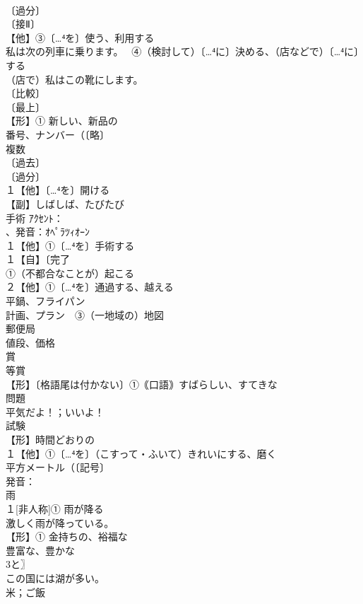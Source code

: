 \documentclass[8pt]{extreport}
\begin{document}
\begin{CJK}{UTF8}{min}
\\	〔過分〕
\\	〔接Ⅱ〕
\\	【他】③〔…⁴を〕使う、利用する 
\\	私は次の列車に乗ります。　 ④（検討して）〔…⁴に〕決める、（店などで）〔…⁴に〕する 
\\	（店で）私はこの靴にします。
\\	〔比較〕
\\	〔最上〕
\\	【形】① 新しい、新品の
\\	番号、ナンバー（〔略〕
\\	複数
\\	〔過去〕
\\	〔過分〕
\\	１【他】〔…⁴を〕開ける
\\	【副】しばしば、たびたび
\\	手術 ｱｸｾﾝﾄ：
\\	、発音：ｵﾍﾟﾗﾂｨｵｰﾝ
\\	１【他】①〔…⁴を〕手術する
\\	１【自】〔完了
\\	①（不都合なことが）起こる 
\\	２【他】①〔…⁴を〕通過する、越える
\\	平鍋、フライパン 
\\	計画、プラン　③（一地域の）地図
\\	郵便局
\\	値段、価格
\\	賞 
\\	等賞
\\	【形】〔格語尾は付かない〕①｟口語｠すばらしい、すてきな
\\	問題 
\\	平気だよ！；いいよ！
\\	試験 
\\	【形】時間どおりの 
\\	１【他】①〔…⁴を〕（こすって・ふいて）きれいにする、磨く
\\	平方メートル（〔記号〕
\\	発音：
\\	雨
\\	１[非人称]① 雨が降る 
\\	激しく雨が降っている。 
\\	【形】① 金持ちの、裕福な
\\	豊富な、豊かな 
\\	3と〗
\\	この国には湖が多い。 
\\	米；ご飯

\end{CJK}
\end{document}
